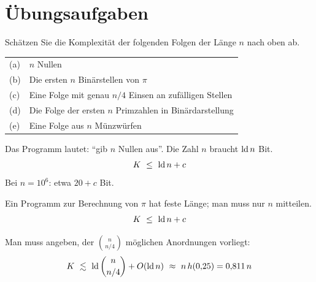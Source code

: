 \section{Übungsaufgaben}

\begin{aufgabe}
Schätzen Sie die Komplexität der folgenden Folgen der Länge $n$ nach oben ab.
\begin{center}
{\small
\renewcommand{\arraystretch}{1.4}
\begin{tabular}{@{}P{0.8cm}P{7.6cm}@{}}
\toprule
(a) & $n$ Nullen\\
(b) & Die ersten $n$ Binärstellen von $\pi$\\
(c) & Eine Folge mit genau $n/4$ Einsen an zufälligen Stellen\\
(d) & Die Folge der ersten $n$ Primzahlen in Binärdarstellung\\
(e) & Eine Folge aus $n$ Münzwürfen\\
\bottomrule
\end{tabular}}
\end{center}

\loesung
{}
Das Programm lautet: \enquote{gib $n$ Nullen aus}. Die Zahl $n$ braucht $\operatorname{ld} n$ Bit.
\[ K \ \le\ \operatorname{ld} n + c \]
Bei $n = 10^6$: etwa $20 + c$ Bit.

Ein Programm zur Berechnung von $\pi$ hat feste Länge; man muss nur $n$ mitteilen.
\[ K \ \le\ \operatorname{ld} n + c \]

\begin{center}
\begin{minipage}{0.86\textwidth}
\end{minipage}
\end{center}

Man muss angeben,  der $\binom{n}{n/4}$ möglichen Anordnungen vorliegt:
\[ K \ \lesssim\ \lb\binom{n}{n/4} + O(\lb n) \ \approx\ n\,h(0{,}25) = 0{,}811\,n \]

\begin{center}
\begin{minipage}{0.86\textwidth}
\end{minipage}
\end{center}


\end{aufgabe}
